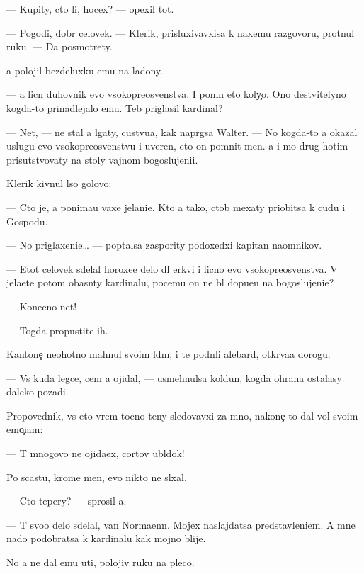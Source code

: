\documentclass[10pt]{book}
\begin{document}
— Kupity, cto li, hocex? — opexil tot.

— Pogodi, dobr{\yi}{\y} celovek. — Klerik, prisluxivavxi{\y}sa k naxemu razgovoru, pro\-t{\ia}\-nul ruku. — Da{\y} posmotrety.

{\Y}a polojil bezdeluxku {\y}emu na ladony.

— {\Y}a licn{\yi}{\y} duhovnik {\y}evo v{\yi}soko\-preosv{\ia}{\x}en\-st\-va. I pomn{\io} eto koly{\c}o. Ono de{\y}stvitelyno kogda-to prinadlejalo {\y}emu. Teb{\ia} priglasil kardinal?

— Net, — ne stal {\y}a lgaty, custvu{\y}a, kak napr{\ia}gsa Walter. — No kogda-to {\y}a okazal uslugu {\y}evo v{\yi}sokopreosv{\ia}{\x}enstvu i uveren, cto on pomnit men{\ia}. {\Y}a i mo{\y} drug hotim prisutstvovaty na stoly vajnom bogoslujeni{\y}i.

Klerik kivnul l{\yi}so{\y} go\-lo\-vo{\y}:

— Cto je, {\y}a ponima{\y}u vaxe jelani{\y}e. Kto {\y}a tako{\y}, ctob{\yi} mexaty priob{\x}itsa k cudu i Gospodu.

— No priglaxeni{\y}e… — pop{\yi}talsa zaspority podoxedxi{\y} kapitan na{\y}om\-ni\-kov.

— Etot celovek sdelal horoxe{\y}e delo dl{\ia} {\C}erkvi i licno {\y}evo v{\yi}soko\-preosv{\ia}{\x}en\-st\-va. V{\yi} jela{\y}ete potom ob{\y}asn{\ia}ty kardinalu, pocemu on ne b{\yi}l dopu{\x}en na bogoslujeni{\y}e?

— Konecno net!

— Togda propustite ih.

Kantone{\c} neohotno mahnul svo{\y}im l{\io}d{\ia}m, i te podn{\ia}li alebard{\yi}, otkr{\yi}va{\y}a do\-ro\-gu.

— Vs{\e} kuda legce, cem {\y}a ojidal, — usmehnulsa koldun, kogda ohrana ostalasy daleko pozadi.

Pro\-po\-ved\-nik, vs{\e} eto vrem{\ia} tocno teny sledovavxi{\y} za mno{\y}, nakone{\c}-to dal vol{\io} svo{\y}im emo{\c}i{\y}am:

— T{\yi} mnogovo ne ojida{\y}ex, cortov ubl{\io}\-dok!

Po scast{\y}u, krome men{\ia}, {\y}evo nikto ne sl{\yi}xal.

— Cto tepery? — sprosil {\y}a.

— T{\yi} svo{\y}o delo sdelal, van Normaenn. Mojex naslajdatsa predstavleni{\y}em. A mne nado podobratsa k kardinalu kak mojno blije.

No {\y}a ne dal {\y}emu u{\y}ti, polojiv ruku na pleco.
\end{document}
